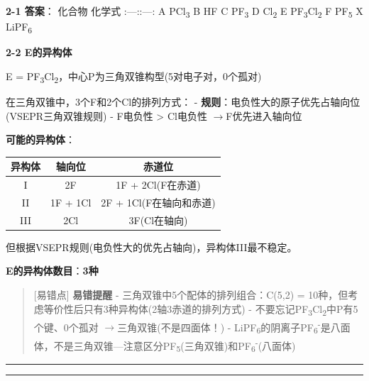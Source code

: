 \documentclass[a4paper,11pt]{ctexart}
\newcounter{none}
\newcommand{\箭}{\ensuremath{\rightarrow}}
\newcommand{\左箭}{\ensuremath{\leftarrow}}
\newcommand{\上箭}{\ensuremath{\uparrow}}
\newcommand{\下箭}{\ensuremath{\downarrow}}
\newcommand{\衡}{\ensuremath{\rightleftharpoons}}
\newcommand{\双箭}{\ensuremath{\leftrightarrow}}
\newcommand{\约等于}{\ensuremath{\approx}}
\newcommand{\小于等于}{\ensuremath{\leq}}
\newcommand{\大于等于}{\ensuremath{\geq}}
\newcommand{\不等于}{\ensuremath{\neq}}
\newcommand{\西格马}{\ensuremath{\sigma}}
\newcommand{\派}{\ensuremath{\pi}}
\begin{document}
\textbf{2-1 答案}：
\textbar{} 化合物 \textbar{} 化学式 \textbar{}
\textbar:---:\textbar:---:\textbar{}
\textbar{} A \textbar{} PCl\textsubscript{3} \textbar{}
\textbar{} B \textbar{} HF \textbar{}
\textbar{} C \textbar{} PF\textsubscript{3} \textbar{}
\textbar{} D \textbar{} Cl\textsubscript{2} \textbar{}
\textbar{} E \textbar{} PF\textsubscript{3}Cl\textsubscript{2} \textbar{}
\textbar{} F \textbar{} PF\textsubscript{5} \textbar{}
\textbar{} X \textbar{} LiPF\textsubscript{6} \textbar{}

\textbf{2-2 E的异构体}

E = PF\textsubscript{3}Cl\textsubscript{2}，中心P为三角双锥构型(5对电子对，0个孤对)

在三角双锥中，3个F和2个Cl的排列方式：
- \textbf{规则}：电负性大的原子优先占轴向位(VSEPR三角双锥规则)
- F电负性 \textgreater{} Cl电负性 \箭 F优先进入轴向位

\textbf{可能的异构体}：

{\def\LTcaptype{none} %
\begin{longtable}[]{@{}ccc@{}}
\toprule\noalign{}
异构体 & 轴向位 & 赤道位 \\
\midrule\noalign{}
\endhead
\bottomrule\noalign{}
\endlastfoot
I & 2F & 1F + 2Cl(F在赤道) \\
II & 1F + 1Cl & 2F + 1Cl(F在轴向和赤道) \\
III & 2Cl & 3F(Cl在轴向) \\
\end{longtable}
}

但根据VSEPR规则(电负性大的优先占轴向)，异构体III最不稳定。

\textbf{E的异构体数目}：\textbf{3种}

\begin{quote}
{[}易错点{]} \textbf{易错提醒}
- 三角双锥中5个配体的排列组合：C(5,2) = 10种，但考虑等价性后只有3种异构体(2轴3赤道的排列方式)
- 不要忘记PF\textsubscript{3}Cl\textsubscript{2}中P有5个键、0个孤对 \箭 三角双锥(不是四面体！)
- LiPF\textsubscript{6}的阴离子PF\textsubscript{6}\textsuperscript{-}是八面体，不是三角双锥---注意区分PF\textsubscript{5}(三角双锥)和PF\textsubscript{6}\textsuperscript{-}(八面体)
\end{quote}

\begin{center}\rule{0.5\linewidth}{0.5pt}\end{center}

\begin{center}\rule{0.5\linewidth}{0.5pt}\end{center}
\end{document}
